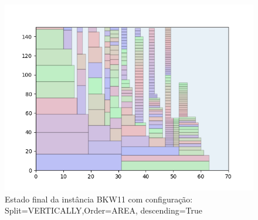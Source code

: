 \begin{figure}[H]
    \centering
    \caption[]{Estado final da instância BKW11 com configuração: Split=VERTICALLY,Order=AREA, descending=True}
    \label{fig:bkw11-vertically-area-true}
    \includegraphics[scale=0.5]{output/figures/bkw/bkw11/vertically/area/true/000}
\end{figure}